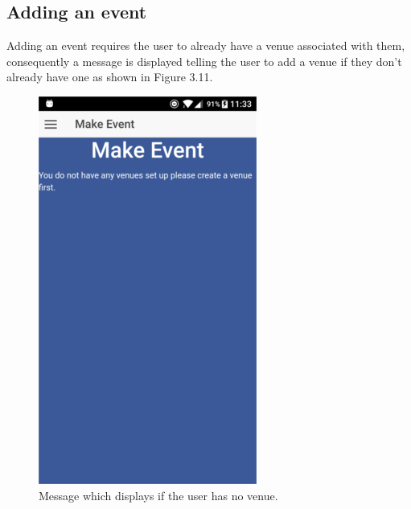 \subsection{Adding an event}
Adding an event requires the user to already have a venue associated with them, consequently a message is displayed telling the user to add a venue if they don't already have one as shown in Figure 3.11.
\begin{center}
\begin{figure}[H]
\begin{center}
\includegraphics[scale=0.5]{images/sc14}
\end{center}
\caption{Message which displays if the user has no venue.}
\end{figure}
\end{center}

